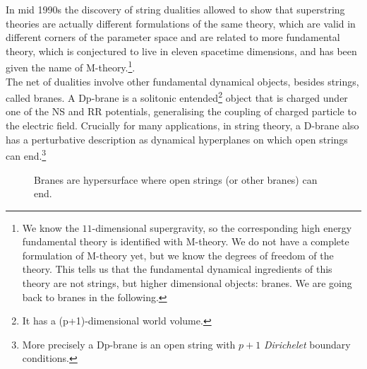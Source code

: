 \documentclass[draft]{phd}
\begin{document}
In mid 1990s the discovery of string dualities allowed to show that superstring theories are actually different formulations of the same theory, which are valid
in different corners of the parameter space and are related to more fundamental theory, which is conjectured to live in eleven spacetime dimensions, and has been given the name of M-theory.\footnote{%
			We know the $11$-dimensional supergravity, so the corresponding high energy fundamental theory is identified with M-theory.
			We do not have a complete formulation of M-theory yet, but we know the degrees of freedom of the theory.
			This tells us that the fundamental dynamical ingredients of this theory are not strings, but higher dimensional objects: branes.
			We are going back to branes in the following.}.	\\
The net of dualities involve other fundamental dynamical objects, besides strings, called branes. A Dp-brane is a solitonic entended\footnote{It has a (p+1)-dimensional world volume.} object that is charged under one 
of the NS and RR potentials, generalising the coupling of charged particle to the electric field. Crucially for many applications, in string theory, a 
 D-brane also has a perturbative description as dynamical hyperplanes on which open strings can end.\footnote{More precisely a Dp-brane is an open string with $p+1$ \emph{Dirichelet} boundary conditions.}
					\begin{figure}[h!]
						\centering
						
						\caption{Branes are hypersurface where open strings (or other branes) can end.}
						\label{branefig}
					\end{figure}
			
\end{document}
